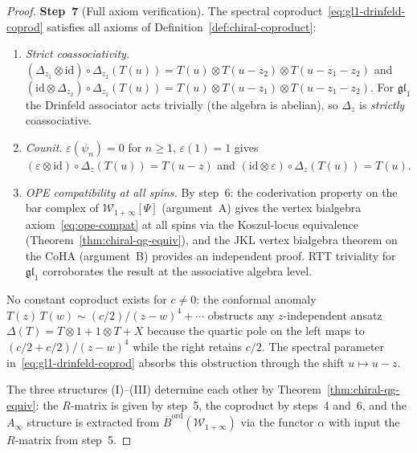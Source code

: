 \documentclass[11pt,reqno]{amsart}
\theoremstyle{definition}
\theoremstyle{remark}
\newcommand{\cW}{\mathcal{W}}
\newcommand{\Ainf}{A_{\infty}}
\newcommand{\Barord}{\overline{B}^{\mathrm{ord}}}
\newcommand{\id}{\mathrm{id}}
\numberwithin{equation}{section}
\begin{document}
\begin{proof}
\medskip
\noindent
\textbf{Step~7}
(Full axiom verification).
The spectral coproduct~\eqref{eq:gl1-drinfeld-coprod}
satisfies all axioms of
Definition~\ref{def:chiral-coproduct}:
\begin{enumerate}[label=\textup{(\alph*)}]
\item \emph{Strict coassociativity.}
  $(\Delta_{z_1} \otimes \id) \circ \Delta_{z_2}(T(u))
  = T(u) \otimes T(u - z_2) \otimes T(u - z_1 - z_2)$
  and
  $(\id \otimes \Delta_{z_2}) \circ \Delta_{z_1}(T(u))
  = T(u) \otimes T(u - z_1) \otimes T(u - z_1 - z_2)$.
  For $\mathfrak{gl}_1$ the Drinfeld associator
  acts trivially (the algebra is abelian), so
  $\Delta_z$ is \emph{strictly} coassociative.
\item \emph{Counit.}
  $\varepsilon(\psi_n) = 0$ for $n \geq 1$,
  $\varepsilon(1) = 1$ gives
  $(\varepsilon \otimes \id) \circ \Delta_z(T(u))
  = T(u - z)$ and
  $(\id \otimes \varepsilon) \circ \Delta_z(T(u))
  = T(u)$.
\item \emph{OPE compatibility at all spins.}
  By step~6: the coderivation property on the bar complex
  of $\cW_{1+\infty}[\Psi]$ (argument~A) gives the vertex
  bialgebra axiom~\eqref{eq:ope-compat} at all spins via
  the Koszul-locus equivalence
  (Theorem~\ref{thm:chiral-qg-equiv}), and the JKL vertex
  bialgebra theorem on the CoHA (argument~B) provides an
  independent proof. RTT triviality for $\mathfrak{gl}_1$
  corroborates the result at the associative algebra level.
\end{enumerate}
No constant coproduct exists for $c \neq 0$: the
conformal anomaly $T(z)\,T(w) \sim (c/2)/(z-w)^4 +
\cdots$ obstructs any $z$-independent ansatz
$\Delta(T) = T \otimes 1 + 1 \otimes T + X$
because the quartic pole on the left maps to
$(c/2 + c/2)/(z-w)^4$ while the right retains $c/2$.
The spectral parameter in~\eqref{eq:gl1-drinfeld-coprod}
absorbs this obstruction through the shift
$u \mapsto u - z$.

The three structures (I)--(III) determine each other by
Theorem~\ref{thm:chiral-qg-equiv}: the $R$-matrix is
given by step~5, the coproduct by steps~4 and~6, and the
$\Ainf$ structure is extracted from
$\Barord(\cW_{1+\infty})$ via the functor $\alpha$
with input the $R$-matrix from step~5.
\end{proof}
\end{document}
